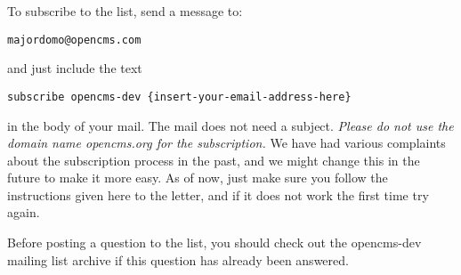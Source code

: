 To subscribe to the list, send a message to:

{\tt majordomo@opencms.com}

and just include the text

{\tt subscribe opencms-dev \{insert-your-email-address-here\}}

in the body of your mail. The mail does not need a subject. 
{\em Please do not use the domain name opencms.org for the subscription.} We have had various complaints about the 
subscription process in the past, and we might change this in the future to make it more easy. As of now, just 
make sure you follow the instructions given here to the letter, and if it does not work the first time try again.

Before posting a question to the list, you should check out the opencms-dev mailing list archive if this question 
has already been answered.
